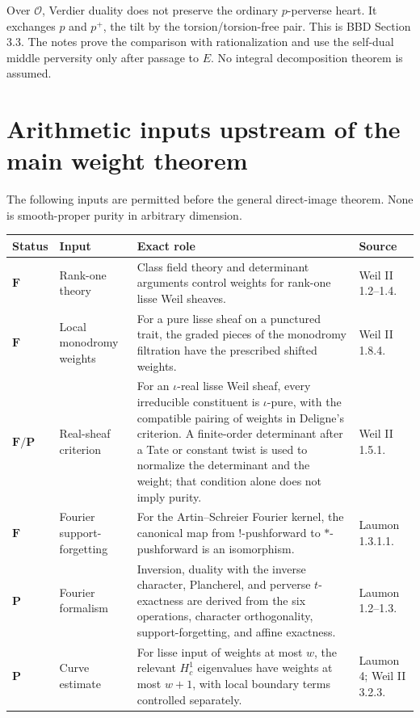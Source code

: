 Over \(\mathcal O\), Verdier duality does not preserve the ordinary
\(p\)-perverse heart.  It exchanges \(p\) and \(p^+\), the tilt by the
torsion/torsion-free pair.  This is BBD Section 3.3.  The notes prove the
comparison with rationalization and use the self-dual middle perversity only
after passage to \(E\).  No integral decomposition theorem is assumed.

\section{Arithmetic inputs upstream of the main weight theorem}

The following inputs are permitted before the general direct-image theorem.
None is smooth-proper purity in arbitrary dimension.

\begin{longtable}{@{}
 >{\raggedright\arraybackslash}p{}
 >{\raggedright\arraybackslash}p{}
 >{\raggedright\arraybackslash}p{}
 >{\raggedright\arraybackslash}p{}@{}}
\toprule
Status & Input & Exact role & Source\\
\midrule
\endhead
\(\mathbf F\) &
Rank-one theory &
Class field theory and determinant arguments control weights for rank-one
lisse Weil sheaves. &
Weil II 1.2--1.4.\\

\(\mathbf F\) &
Local monodromy weights &
For a pure lisse sheaf on a punctured trait, the graded pieces of the
monodromy filtration have the prescribed shifted weights. &
Weil II 1.8.4.\\

\(\mathbf F/\mathbf P\) &
Real-sheaf criterion &
For an \(\iota\)-real lisse Weil sheaf, every irreducible constituent is
\(\iota\)-pure, with the compatible pairing of weights in Deligne's
criterion.  A finite-order determinant after a Tate or constant twist is
used to normalize the determinant and the weight; that condition alone does
not imply purity. &
Weil II 1.5.1.\\

\(\mathbf F\) &
Fourier support-forgetting &
For the Artin--Schreier Fourier kernel, the canonical map from
\(!\)-pushforward to \(*\)-pushforward is an isomorphism. &
Laumon 1.3.1.1.\\

\(\mathbf P\) &
Fourier formalism &
Inversion, duality with the inverse character, Plancherel, and perverse
\(t\)-exactness are derived from the six operations, character
orthogonality, support-forgetting, and affine exactness. &
Laumon 1.2--1.3.\\

\(\mathbf P\) &
Curve estimate &
For lisse input of weights at most \(w\), the relevant
\(H_c^1\) eigenvalues have weights at most \(w+1\), with local boundary
terms controlled separately. &
Laumon 4; Weil II 3.2.3.\\
\bottomrule
\end{longtable}

